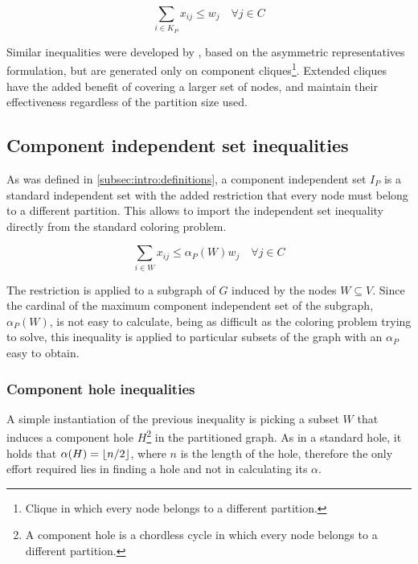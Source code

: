 \begin{equation}
\label{ineq:extendedclique}
\sum_{i \in K_P} x_{ij} \leq w_{j} \quad \forall j \in C
\end{equation}

Similar inequalities were developed by \cite{frota2010branch}, based on the asymmetric representatives formulation, but are generated only on component cliques\footnote{Clique in which every node belongs to a different partition.}. Extended cliques have the added benefit of covering a larger set of nodes, and maintain their effectiveness regardless of the partition size used.

\subsection{Component independent set inequalities}

As was defined in \ref{subsec:intro:definitions}, a component independent set $I_P$ is a standard independent set with the added restriction that every node must belong to a different partition. This allows to import the independent set inequality directly from the standard coloring problem.

\begin{equation}
\label{ineq:ciset}
\sum _{i \in W} x_{ij} \leq \alpha_P(W) w_{j} \quad \forall j \in C
\end{equation}

The restriction is applied to a subgraph of $G$ induced by the nodes $W \subseteq V$. Since the cardinal of the maximum component independent set of the subgraph, $\alpha_P(W)$, is not easy to calculate, being as difficult as the coloring problem trying to solve, this inequality is applied to particular subsets of the graph with an $\alpha_P$ easy to obtain.

\subsubsection*{Component hole inequalities}

A simple instantiation of the previous inequality is picking a subset $W$ that induces a component hole $H$\footnote{A component hole is a chordless cycle in which every node belongs to a different partition.} in the partitioned graph. As in a standard hole, it holds that $\alpha(H) = \left\lfloor n / 2 \right\rfloor$, where $n$ is the length of the hole, therefore the only effort required lies in finding a hole and not in calculating its $\alpha$.

